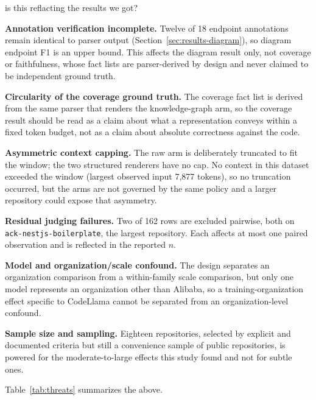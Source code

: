 is this reflacting the results we got?\documentclass[conference]{IEEEtran}
\begin{document}
\textbf{Annotation verification incomplete.} Twelve of 18 endpoint annotations remain identical
to parser output (Section~\ref{sec:results-diagram}), so diagram endpoint F1 is an upper bound.
This affects the diagram result only, not coverage or faithfulness, whose fact lists are
parser-derived by design and never claimed to be independent ground truth.

\textbf{Circularity of the coverage ground truth.} The coverage fact list is derived from the
same parser that renders the knowledge-graph arm, so the coverage result should be read as a
claim about what a representation conveys within a fixed token budget, not as a claim about
absolute correctness against the code.

\textbf{Asymmetric context capping.} The raw arm is deliberately truncated to fit the window;
the two structured renderers have no cap. No context in this dataset exceeded the window
(largest observed input 7{,}877 tokens), so no truncation occurred, but the arms are not
governed by the same policy and a larger repository could expose that asymmetry.

\textbf{Residual judging failures.} Two of 162 rows are excluded pairwise, both on
\texttt{ack-nestjs-boilerplate}, the largest repository. Each affects at most one paired
observation and is reflected in the reported $n$.

\textbf{Model and organization/scale confound.} The design separates an organization comparison
from a within-family scale comparison, but only one model represents an organization other than
Alibaba, so a training-organization effect specific to CodeLlama cannot be separated from an
organization-level confound.

\textbf{Sample size and sampling.} Eighteen repositories, selected by explicit and documented
criteria but still a convenience sample of public repositories, is powered for the
moderate-to-large effects this study found and not for subtle ones.

Table~\ref{tab:threats} summarizes the above.
\end{document}

